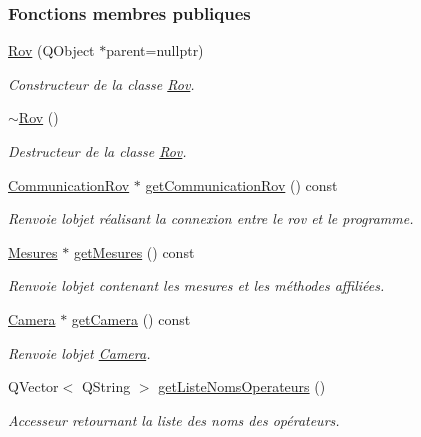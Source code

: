 \subsubsection*{Fonctions membres publiques}
\begin{DoxyCompactItemize}
\item 
\hyperlink{class_rov_a5dddd3bd156c134848078296087d090c}{Rov} (Q\+Object $\ast$parent=nullptr)
\begin{DoxyCompactList}\small\item\em Constructeur de la classe \hyperlink{class_rov}{Rov}. \end{DoxyCompactList}\item 
\hyperlink{class_rov_a6e41f712195b9af74fd75b781745d1b5}{$\sim$\+Rov} ()
\begin{DoxyCompactList}\small\item\em Destructeur de la classe \hyperlink{class_rov}{Rov}. \end{DoxyCompactList}\item 
\hyperlink{class_communication_rov}{Communication\+Rov} $\ast$ \hyperlink{class_rov_ad30543625f584e28bf785a80c59506dc}{get\+Communication\+Rov} () const
\begin{DoxyCompactList}\small\item\em Renvoie l\textquotesingle{}objet réalisant la connexion entre le rov et le programme. \end{DoxyCompactList}\item 
\hyperlink{class_mesures}{Mesures} $\ast$ \hyperlink{class_rov_a0edd5f7db785bd856b8723fe49ca7848}{get\+Mesures} () const
\begin{DoxyCompactList}\small\item\em Renvoie l\textquotesingle{}objet contenant les mesures et les méthodes affiliées. \end{DoxyCompactList}\item 
\hyperlink{class_camera}{Camera} $\ast$ \hyperlink{class_rov_aae07e8ca2c4b3be6a0a378b6f072c60b}{get\+Camera} () const
\begin{DoxyCompactList}\small\item\em Renvoie l\textquotesingle{}objet \hyperlink{class_camera}{Camera}. \end{DoxyCompactList}\item 
Q\+Vector$<$ Q\+String $>$ \hyperlink{class_rov_ab585cb1f82344ba0a64a28488910b262}{get\+Liste\+Noms\+Operateurs} ()
\begin{DoxyCompactList}\small\item\em Accesseur retournant la liste des noms des opérateurs. \end{DoxyCompactList}\item 

\end{DoxyCompactItemize}
